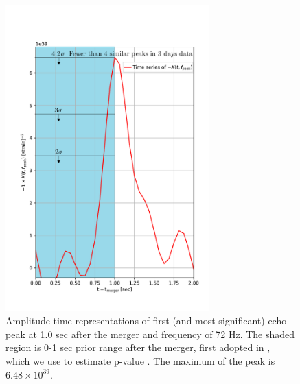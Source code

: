 \documentclass[a4paper,11pt]{article}
\begin{document}
\begin{figure}[!tbp]
\centering
    \includegraphics[width=0.7\textwidth]{peak_in_short_time.pdf}
 \caption{Amplitude-time representations of first (and most significant) echo peak at 1.0 sec after the merger and frequency of 72 Hz. The shaded region is 0-1 sec prior range after the merger, first adopted in \cite{Abbott:2017dke}, which we use to estimate p-value . The maximum of the peak is $6.48\times10^{39}$.}
 \label{NS-NS_9}
\end{figure}
\end{document}
